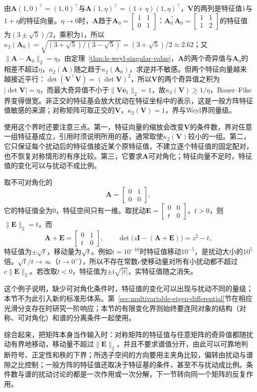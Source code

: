 由$\bm A(1,0)^\top=(1,0)^\top$与$\bm A(1,\eta)^\top=(1+\eta)(1,\eta)^\top$，$\bm V$的两列是特征值$1$与$1+\eta$的特征向量。$\eta\to0$时，$\bm A$趋于$\bm A_0=\left[\begin{smallmatrix}1&1\\0&1\end{smallmatrix}\right]$：$\bm A_0^\top\bm A_0=\left[\begin{smallmatrix}1&1\\1&2\end{smallmatrix}\right]$的特征值为$(3\pm\sqrt5)/2$，乘积为$1$，所以$\kappa_2(\bm A_0)=\sqrt{(3+\sqrt5)/(3-\sqrt5)}=(3+\sqrt5)/2\approx2.62$；又$\lVert\bm A-\bm A_0\rVert_2=\eta$，由定理~\ref{thm:ls-weyl-singular-value}，$\bm A$的两个奇异值与$\bm A_0$的相差不超过$\eta$，$\kappa_2(\bm A)$随之趋于$\kappa_2(\bm A_0)$，求逆并不敏感。但两个特征向量越来越接近平行：$\det(\bm V^\top\bm V)=(\det\bm V)^2$，所以$\bm V$的两个奇异值之积为$|\det\bm V|=\eta$，而最大奇异值不小于$\lVert\bm V\bm e_1\rVert_2=1$，故$\kappa_2(\bm V)\geq1/\eta$，Bauer--Fike界变得很宽。非正交的特征基会放大扰动在特征坐标中的表示，这是一般方阵特征值敏感的来源；对称矩阵可取正交的$\bm V$，$\kappa_2(\bm V)=1$，界与Weyl界同量级。

使用这个界时还要注意三点。第一，特征向量的缩放会改变$\bm V$的条件数，界对任意一组特征基成立，引用时须说明所用的基，通常取使$\kappa_2(\bm V)$较小的一组。第二，它只保证每个扰动后的特征值接近某个原特征值，不建立逐个特征值的固定配对，也不恢复对称情形的有序比较。第三，它要求$\bm A$可对角化；特征向量不足时，特征值的变化可以与扰动不成比例。
\begin{example}[特征值的移动远大于扰动]
\label{ex:ls-jordan-eigenvalue-sensitivity}
取不可对角化的
\[
 \bm A=\begin{bmatrix}0&1\\0&0\end{bmatrix},
\]
它的特征值全为$0$，特征空间只有一维。取扰动$\bm E=\left[\begin{smallmatrix}0&0\\t&0\end{smallmatrix}\right]$，$t>0$，则$\lVert\bm E\rVert_2=t$，而
\[
 \bm A+\bm E=\begin{bmatrix}0&1\\t&0\end{bmatrix},\qquad
 \det\bigl(z\bm I-(\bm A+\bm E)\bigr)=z^2-t ,
\]
特征值为$\pm\sqrt t$，移动量为$\sqrt t$。例如$t=10^{-10}$时特征值移动$10^{-5}$，是扰动大小的$10^5$倍。$\sqrt t/t\to\infty$（$t\to0^+$），所以不存在常数$c$使移动量对所有小扰动都不超过$c\lVert\bm E\rVert_2$。若改取$t<0$，特征值为$\pm\mathrm i\sqrt{|t|}$，实特征值随之消失。
\end{example}
这个例子说明，缺少可对角化条件时，特征值的变化可以出现与扰动不同的量级；本节不为此引入新的标准形体系。第~\ref{sec:multivariable-eigen-differential}节在相应光滑分支存在时研究一阶响应；本节的有限变化界则始终要连同对象的结构（对称、可对角化）和谱的分离条件一起使用。

综合起来，把矩阵本身当作输入时：对称矩阵的特征值与任意矩阵的奇异值都随扰动有界地移动，移动量不超过$\lVert\bm E\rVert_2$，并且不要求谱值分开，由此可以可靠地判断符号、正定性和秩的下界；所选子空间的方向要用主夹角比较，偏转由扰动与谱隙之比控制；一般方阵的特征值还取决于特征基的条件，甚至不与扰动成比例。条件数与谱的扰动讨论的都是一次作用或一次分解，下一节转向同一个矩阵的反复作用。
